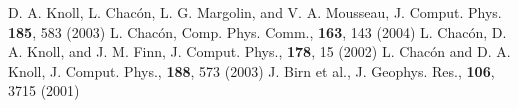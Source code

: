 \documentclass{report}
\begin{document}
\begin{thebibliography}{1}
D. A. Knoll, L. Chac\'{o}n, L. G. Margolin, and V. A. Mousseau, J.
Comput. Phys. \textbf{185}, 583 (2003)
 \vspace{-8pt} L. Chac\'{o}n, Comp. Phys. Comm., \textbf{163}, 143
(2004)
 \vspace{-8pt} L. Chac\'{o}n, D. A. Knoll, and J.
M. Finn, J. Comput.
Phys., \textbf{178}, 15 (2002)
 \vspace{-8pt} L. Chac\'{o}n and D. A. Knoll, J. Comput. Phys.,
\textbf{188}, 573 (2003)
 \vspace{-8pt} J. Birn et al., J. Geophys. Res., \textbf{106}, 3715
(2001)\end{thebibliography}
\end{document}
